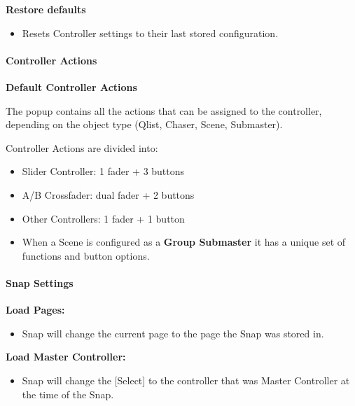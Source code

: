 \documentclass[
]{article}
\providecommand{\tightlist}{%
  \setlength{\itemsep}{0pt}\setlength{\parskip}{0pt}}
\begin{document}
\textbf{Restore defaults}

\begin{itemize}
\tightlist
\item
  Resets Controller settings to their last stored configuration.
\end{itemize}

\hypertarget{controller-actions}{%
\paragraph{Controller Actions}\label{controller-actions}}

\textbf{Default Controller Actions}

The popup contains all the actions that can be assigned to the controller, depending on the object type (Qlist, Chaser, Scene, Submaster).

Controller Actions are divided into:

\begin{itemize}
\item
  Slider Controller: 1 fader + 3 buttons
\item
  A/B Crossfader: dual fader + 2 buttons
\item
  Other Controllers: 1 fader + 1 button
\end{itemize}

\begin{itemize}
\tightlist
\item
  When a Scene is configured as a \textbf{Group Submaster} it has a unique set of functions and button options.
\end{itemize}

\hypertarget{snap-settings}{%
\paragraph{Snap Settings}\label{snap-settings}}

\textbf{Load Pages:}

\begin{itemize}
\tightlist
\item
  Snap will change the current page to the page the Snap was stored in.
\end{itemize}

\textbf{Load Master Controller:}

\begin{itemize}
\tightlist
\item
  Snap will change the {[}Select{]} to the controller that was Master Controller at the time of the Snap.
\end{itemize}
\end{document}
